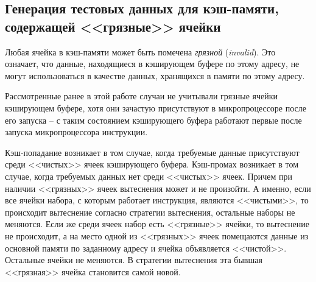 

\subsection{Генерация тестовых данных для кэш-памяти, содержащей
<<грязные>> ячейки}

Любая ячейка в кэш-памяти может быть помечена \emph{грязной}
(\emph{invalid}). Это означает, что данные, находящиеся в кэширующем
буфере по этому адресу, не могут использоваться в качестве данных,
хранящихся в памяти по этому адресу.

Рассмотренные ранее в этой работе случаи не учитывали грязные ячейки
кэширующем буфере, хотя они зачастую присутствуют в микропроцессоре
после его запуска -- с таким состоянием кэширующего буфера работают
первые после запуска микропроцессора инструкции.

Кэш-попадание возникает в том случае, когда требуемые данные
присутствуют среди <<чистых>> ячеек кэширующего буфера. Кэш-промах
возникает в том случае, когда требуемых данных нет среди <<чистых>>
ячеек. Причем при наличии <<грязных>> ячеек вытеснения может и не
произойти. А именно, если все ячейки набора, с которым работает
инструкция, являются <<чистыми>>, то происходит вытеснение согласно
стратегии вытеснения, остальные наборы не меняются. Если же среди
ячеек набор есть <<грязные>> ячейки, то вытеснение не происходит, а
на место одной из <<грязных>> ячеек помещаются данные из основной
памяти по заданному адресу и ячейка объявляется <<чистой>>.
Остальные ячейки не меняются. В стратегии вытеснения \LRU эта бывшая
<<грязная>> ячейка становится самой новой.


